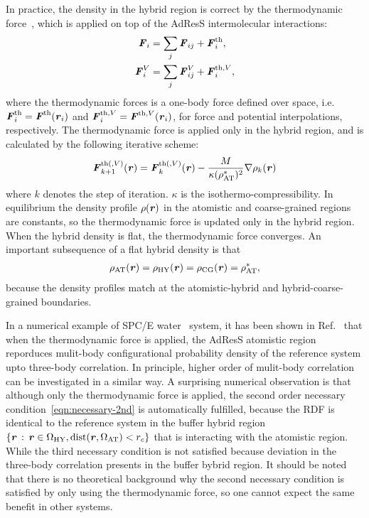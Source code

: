 \documentclass[epjST]{svjour}
\newcommand{\vect}[1]{\textbf{\textit{#1}}}
\newcommand{\dist}[0]{\textrm {dist}}
\newcommand{\AT}[0]{\textrm{AT}}
\newcommand{\HY}[0]{\textrm{HY}}
\newcommand{\CG}[0]{\textrm{CG}}
\newcommand{\moleidxone}[0]{i}
\newcommand{\moleidxtwo}[0]{j}
\newcommand{\thf}{{\textrm{th}}}
\begin{document}
In practice, the density in the hybrid region is correct by the
thermodynamic force~\cite{fritsch2012adaptive}, which is applied on top of the AdResS intermolecular interactions:
\begin{align}
  \vect F_\moleidxone &= \sum_\moleidxtwo \vect F_{\moleidxone\moleidxtwo}  + \vect F_\moleidxone^\thf,  \\
  \vect F^V_\moleidxone& = \sum_\moleidxtwo \vect F^V_{\moleidxone\moleidxtwo} + \vect F_\moleidxone^{\thf,V},
\end{align}
where the thermodynamic forces is a one-body force defined over space,
i.e.~$\vect F^\thf_i = \vect F^\thf(\vect r_\moleidxone)$ and $\vect F^{\thf, V}_\moleidxone = \vect F^{\thf,V}(\vect r_\moleidxone)$,
for force and potential interpolations, respectively.
The thermodynamic force is applied only in the hybrid region, and is
calculated by the following iterative scheme:
\begin{align}
  \vect F_{k+1}^{\thf(, V)} (\vect r) = \vect F_k^{\thf(, V)} (\vect r)-
  \frac{M}{\kappa(\rho^\ast_\AT)^2} \nabla\rho_k(\vect r)
\end{align}
where $k$ denotes the step of iteration. $\kappa$ is the
isothermo-compressibility. In equilibrium the density profile $\rho(\vect r)$ in the
atomistic and coarse-grained regions are constants, so the thermodynamic force
is updated only in the hybrid region. When the hybrid density is flat, the thermodynamic
force converges. An important subsequence of a flat hybrid density is that
\begin{align}
  \rho_\AT(\vect r) = \rho_\HY(\vect r) = \rho_\CG(\vect r) = \rho_\AT^\ast,
\end{align}
because the density profiles match at the atomistic-hybrid and
hybrid-coarse-grained boundaries.

In a numerical example of SPC/E water~\cite{berendsen1987missing}
system, it has been shown in Ref.~\cite{wang2013grand} that when the
thermodynamic force is applied, the AdResS atomistic region reporduces
mulit-body configurational probability density of the reference system
upto three-body correlation.
In principle, higher order of mulit-body correlation can be investigated in
a similar way. A surprising numerical observation is that although
only the thermodynamic force is applied, the second order necessary condition~\eqref{eqn:necessary-2nd}
is automatically fulfilled, because the RDF is identical to the reference system in the buffer hybrid region
$\{\vect r \,:\, \vect r \in\Omega_\HY, \dist(\vect r, \Omega_\AT) < r_c\}$ that is interacting with
the atomistic region. While the third necessary condition is not satisfied because deviation
in the three-body correlation presents in the buffer bybrid region.
It should be noted that there is no theoretical background why the second necessary
condition is satisfied by only using the thermodynamic force,
so one cannot expect the same benefit in other systems.
\end{document}
